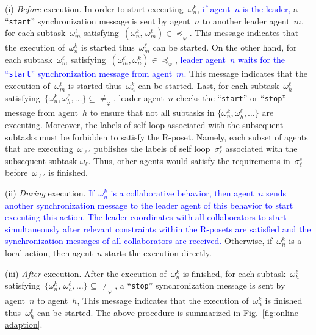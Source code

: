 (i) \emph{Before} execution.
In order to start executing~$\omega^k_n$, \textcolor{blue}{if agent~$n$ is the leader,}
a ``\texttt{start}'' synchronization message is sent by agent~$n$ to another leader agent~$m$,
for each subtask~$\omega^\ell_m$
satisfying~$(\omega^k_n,\,\omega^\ell_m)\in \preceq_{\varphi}$.
This message indicates that the execution of~$\omega^k_n$ is started
thus~$\omega^\ell_m$ can be started.
On the other hand, for each subtask~$\omega^\ell_m$
satisfying~$(\omega^\ell_m, \omega^k_n)\in \preceq_{\varphi}$,
\textcolor{blue}{leader agent~$n$ waits for the ``\texttt{start}'' synchronization message
from agent~$m$.}
This message indicates that the execution of~$\omega^\ell_m$ is started
thus~$\omega^k_n$ can be started.
Last, for each subtask~$\omega^\ell_h$
satisfying~$\{\omega^k_n,\omega^\ell_h,\dots\}\subseteq \neq_{\varphi}$,
leader agent~$n$ checks the ``\texttt{start}'' or ``\texttt{stop}'' message
from agent~$h$ to ensure that not all subtasks in $\{\omega^k_n,\omega^\ell_h,\dots\}$ are executing.
Moreover, the labels of self loop associated with the subsequent subtasks must be forbidden to satisfy the R-poset.
Namely, each subset of agents that are executing~$\omega_{\ell'}$ publishes
the labels of self loop~$\sigma^s_\ell$ associated with the subsequent subtask $\omega_\ell$.
Thus, other agents would satisfy the requirements in~$\sigma^s_\ell$
before~$\omega_{\ell'}$ is finished.


(ii) \emph{During} execution.
\textcolor{blue}{If~$\omega^k_n$ is a collaborative behavior, then
agent~$n$ sends another synchronization message to the leader agent
of this behavior to start executing this action. 
The leader coordinates with all collaborators to start simultaneously
after relevant constraints within the R-posets are satisfied and
the synchronization messages of all collaborators are received. }
Otherwise, if~$\omega^k_n$ is a local action, then agent~$n$ starts the
execution directly.

(iii) \emph{After} execution.
After the execution of~$\omega^k_n$ is finished,
for each subtask~$\omega^\ell_h$
satisfying~$\{\omega^k_n,\,\omega^\ell_h,\dots\}\subseteq \neq_{\varphi}$,
a ``\texttt{stop}'' synchronization message is sent by agent~$n$ to agent~$h$,
This message indicates that the execution of~$\omega^k_n$ is finished
thus~$\omega^\ell_h$ can be started.
The above procedure is summarized in Fig.~\ref{fig:online adaption}.

